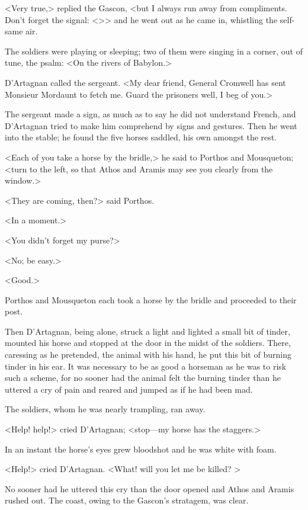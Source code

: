 <Very true,> replied the Gascon, <but I always run away from compliments. Don't forget the signal: <>> and he went out as he came in, whistling the self-same air.

The soldiers were playing or sleeping; two of them were singing in a corner, out of tune, the psalm: <On the rivers of Babylon.>

D'Artagnan called the sergeant. <My dear friend, General Cromwell has sent Monsieur Mordaunt to fetch me. Guard the prisoners well, I beg of you.>

The sergeant made a sign, as much as to say he did not understand French, and D'Artagnan tried to make him comprehend by signs and gestures. Then he went into the stable; he found the five horses saddled, his own amongst the rest.

<Each of you take a horse by the bridle,> he said to Porthos and Mousqueton; <turn to the left, so that Athos and Aramis may see you clearly from the window.>

<They are coming, then?> said Porthos.

<In a moment.>

<You didn't forget my purse?>

<No; be easy.>

<Good.>

Porthos and Mousqueton each took a horse by the bridle and proceeded to their post.

Then D'Artagnan, being alone, struck a light and lighted a small bit of tinder, mounted his horse and stopped at the door in the midst of the soldiers. There, caressing as he pretended, the animal with his hand, he put this bit of burning tinder in his ear. It was necessary to be as good a horseman as he was to risk such a scheme, for no sooner had the animal felt the burning tinder than he uttered a cry of pain and reared and jumped as if he had been mad.

The soldiers, whom he was nearly trampling, ran away.

<Help! help!> cried D'Artagnan; <stop—my horse has the staggers.>

In an instant the horse's eyes grew bloodshot and he was white with foam.

<Help!> cried D'Artagnan. <What! will you let me be killed? >

No sooner had he uttered this cry than the door opened and Athos and Aramis rushed out. The coast, owing to the Gascon's stratagem, was clear.

